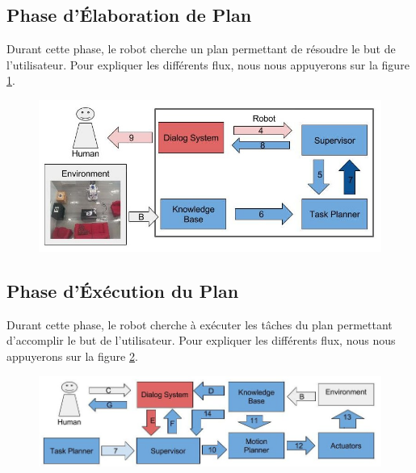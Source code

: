 \documentclass[a4paper,11pt,twoside]{StyleThese}
\begin{document}
\subsection{Phase d'Élaboration de Plan}
Durant cette phase, le robot cherche un plan permettant de résoudre le but de l'utilisateur. Pour expliquer les différents flux, nous nous appuyerons sur la figure \ref{fig:phase2}.




\begin{figure}[ht!]
 \centering
  \includegraphics[width=0.99\linewidth]{./img/phase2color.jpg} 
  \caption {}
  \label{fig:phase2}
\end{figure}




\subsection{Phase d'Éxécution du Plan}
Durant cette phase, le robot cherche à exécuter les tâches du plan permettant d'accomplir le but de l'utilisateur. Pour expliquer les différents flux, nous nous appuyerons sur la figure \ref{fig:phase3}.




\begin{figure}[ht!]
 \centering
  \includegraphics[width=0.99\linewidth]{./img/phase3color.jpg} 
  \caption {}
  \label{fig:phase3}
\end{figure}
\end{document}
